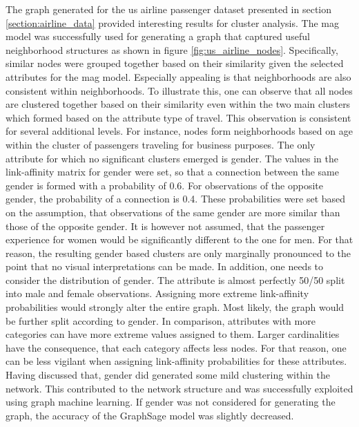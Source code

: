   The graph generated for the \acs{us} airline passenger dataset presented in 
  section \ref{section:airline_data} provided interesting results for cluster 
  analysis. The \acs{mag} model was successfully used for generating a graph that 
  captured useful neighborhood structures as shown in figure \ref{fig:us_airline_nodes}. 
  Specifically, similar nodes were grouped together based on their similarity 
  given the selected attributes for the \acs{mag} model. Especially appealing is 
  that neighborhoods are also consistent within neighborhoods. To illustrate this, 
  one can observe that all nodes are clustered together based on their 
  similarity even within the two main clusters which formed based on the 
  attribute type of travel. This observation is consistent for several 
  additional levels. For instance, nodes form neighborhoods based on age within 
  the cluster of passengers traveling for business purposes. The only attribute 
  for which no significant clusters emerged is gender. The values in the 
  link-affinity matrix for gender were set, so that a connection between the
  same gender is formed with a probability of 0.6. For observations of the
  opposite gender, the probability of a connection is 0.4. These probabilities 
  were set based on the assumption, that observations of the same gender are 
  more similar than those of the opposite gender. It is however not assumed, 
  that the passenger experience for women would be significantly different to 
  the one for men. For that reason, the resulting gender based clusters are
  only marginally pronounced to the point that no visual interpretations can be
  made. In addition, one needs to consider the distribution of gender. The
  attribute is almost perfectly 50/50 split into male and female observations.
  Assigning more extreme link-affinity probabilities would strongly alter the
  entire graph. Most likely, the graph would be further split according to
  gender. In comparison, attributes with more categories can have more extreme
  values assigned to them. Larger cardinalities have the consequence, that each
  category affects less nodes. For that reason, one can be less vigilant when
  assigning link-affinity probabilities for these attributes. Having discussed
  that, gender did generated some mild clustering within the network. This 
  contributed to the network structure and was successfully exploited using 
  graph machine learning. If gender was not considered for generating the graph, 
  the accuracy of the GraphSage model was slightly decreased. \\


